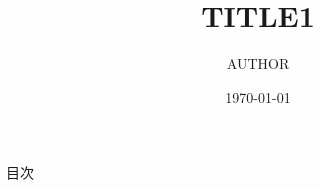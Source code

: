 \documentclass[dvipdfmx,11pt,uplatex, notheorems]{beamer}
\title{TITLE1}
\author{AUTHOR}
\date{\today}
\begin{document}
\frame{\maketitle}

\begin{frame}{目次}
  \tableofcontents
\end{frame}



\end{document}
